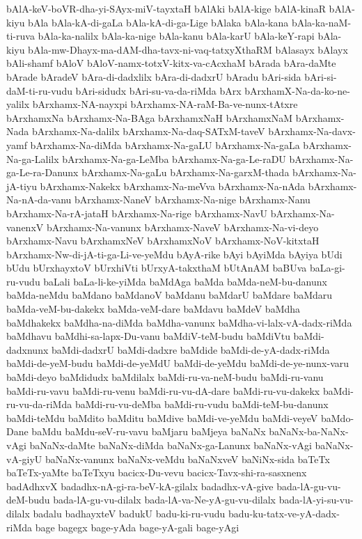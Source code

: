 {bAlA-keV-boVR-dha-yi-SAyx-miV-tayxtaH
bAlAki
bAlA-kige
bAlA-kinaR
bAlA-kiyu
bAla
bAla-kA-di-gaLa
bAla-kA-di-ga-Lige
bAlaka
bAla-kana
bAla-ka-naM-ti-ruva
bAla-ka-nalilx
bAla-ka-nige
bAla-kanu
bAla-karU
bAla-keY-rapi
bAla-kiyu
bAla-mw-Dhayx-ma-dAM-dha-tavx-ni-vaq-tatxyXthaRM
bAlasayx
bAlayx
bAli-shamf
bAloV
bAloV-namx-totxV-kitx-va-cAcxhaM
bArada
bAra-daMte
bArade
bAradeV
bAra-di-dadxlilx
bAra-di-dadxrU
bAradu
bAri-sida
bAri-si-daM-ti-ru-vudu
bAri-sidudx
bAri-su-va-da-riMda
bArx
bArxhamX-Na-da-ko-ne-yalilx
bArxhamx-NA-nayxpi
bArxhamx-NA-raM-Ba-ve-nunx-tAtxre
bArxhamxNa
bArxhamx-Na-BAga
bArxhamxNaH
bArxhamxNaM
bArxhamx-Nada
bArxhamx-Na-dalilx
bArxhamx-Na-daq-SATxM-taveV
bArxhamx-Na-davx-yamf
bArxhamx-Na-diMda
bArxhamx-Na-gaLU
bArxhamx-Na-gaLa
bArxhamx-Na-ga-Lalilx
bArxhamx-Na-ga-LeMba
bArxhamx-Na-ga-Le-raDU
bArxhamx-Na-ga-Le-ra-Danunx
bArxhamx-Na-gaLu
bArxhamx-Na-garxM-thada
bArxhamx-Na-jA-tiyu
bArxhamx-Nakekx
bArxhamx-Na-meVva
bArxhamx-Na-nAda
bArxhamx-Na-nA-da-vanu
bArxhamx-NaneV
bArxhamx-Na-nige
bArxhamx-Nanu
bArxhamx-Na-rA-jataH
bArxhamx-Na-rige
bArxhamx-NavU
bArxhamx-Na-vanenxV
bArxhamx-Na-vanunx
bArxhamx-NaveV
bArxhamx-Na-vi-deyo
bArxhamx-Navu
bArxhamxNeV
bArxhamxNoV
bArxhamx-NoV-kitxtaH
bArxhamx-Nw-di-jA-ti-ga-Li-ve-yeMdu
bAyA-rike
bAyi
bAyiMda
bAyiya
bUdi
bUdu
bUrxhayxtoV
bUrxhiVti
bUrxyA-takxthaM
bUtAnAM
baBUva
baLa-gi-ru-vudu
baLali
baLa-li-ke-yiMda
baMdAga
baMda
baMda-neM-bu-danunx
baMda-neMdu
baMdano
baMdanoV
baMdanu
baMdarU
baMdare
baMdaru
baMda-veM-bu-dakekx
baMda-veM-dare
baMdavu
baMdeV
baMdha
baMdhakekx
baMdha-na-diMda
baMdha-vanunx
baMdha-vi-lalx-vA-dadx-riMda
baMdhavu
baMdhi-sa-lapx-Du-vanu
baMdiV-teM-budu
baMdiVtu
baMdi-dadxnunx
baMdi-dadxrU
baMdi-dadxre
baMdide
baMdi-de-yA-dadx-riMda
baMdi-de-yeM-budu
baMdi-de-yeMdU
baMdi-de-yeMdu
baMdi-de-ye-nunx-varu
baMdi-deyo
baMdidudx
baMdilalx
baMdi-ru-va-neM-budu
baMdi-ru-vanu
baMdi-ru-vavu
baMdi-ru-venu
baMdi-ru-vu-dA-dare
baMdi-ru-vu-dakekx
baMdi-ru-vu-da-riMda
baMdi-ru-vu-deMba
baMdi-ru-vudu
baMdi-teM-bu-danunx
baMdi-teMdu
baMdito
baMditu
baMdive
baMdi-ve-yeMdu
baMdi-veyeV
baMdo-Dane
baMdu
baMdu-seV-ru-vavu
baMjaru
baMjeya
baNaNx
baNaNx-ba-NaNx-vAgi
baNaNx-daMte
baNaNx-diMda
baNaNx-ga-Lanunx
baNaNx-vAgi
baNaNx-vA-giyU
baNaNx-vanunx
baNaNx-veMdu
baNaNxveV
baNiNx-sida
baTeTx
baTeTx-yaMte
baTeTxyu
bacicx-Du-vevu
bacicx-Tavx-shi-ra-sasxnenx
badAdhxvX
badadhx-nA-gi-ra-beV-kA-gilalx
badadhx-vA-give
bada-lA-gu-vu-deM-budu
bada-lA-gu-vu-dilalx
bada-lA-va-Ne-yA-gu-vu-dilalx
bada-lA-yi-su-vu-dilalx
badalu
badhayxteV
badukU
badu-ki-ru-vudu
badu-ku-tatx-ve-yA-dadx-riMda
bage
bagegx
bage-yAda
bage-yA-gali
bage-yAgi
}
